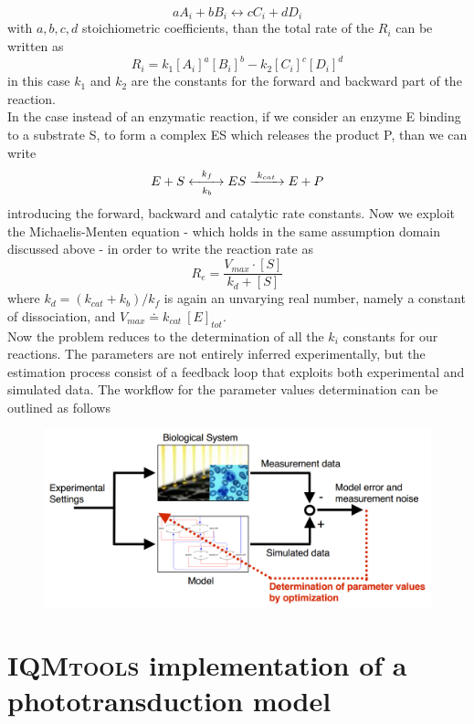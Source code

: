 \documentclass[pdf, color,12pt]{CITnote}
\begin{document}
$$ aA_i+bB_i\longleftrightarrow cC_i+dD_i
$$
with $a,b,c,d$ stoichiometric coefficients, than the total rate of the $R_i$ can be written as
$$ R_i = k_1[A_i]^a[B_i]^b-k_2[C_i]^c[D_i]^d
$$
in this case $k_1$ and $k_2$ are the constants for the forward and backward part of the reaction.
\\ In the case instead of an enzymatic reaction, if we consider an enzyme E binding to a substrate S, to form a complex ES which releases the product P, than we can write
$$E+S\xleftrightarrow[\ \ k_b \ \ ]{\ \ k_f \ \ } ES \xrightarrow{\ k_{cat} \ } E+P
$$
introducing the forward, backward and catalytic rate constants.
Now we exploit the Michaelis-Menten equation - which holds in the same assumption domain discussed above - in order to write the reaction rate as
$$R_e=\frac{V_{max}\cdot [S]}{k_d+[S]}
$$
where $k_d=(k_{cat}+k_b)/k_f$ is again an unvarying real number, namely a constant of dissociation, and $V_{max}\doteq k_{cat}\ [E]_{tot}$.
\\ Now the problem reduces to the determination of all the $k_i$ constants for our reactions.
The parameters are not entirely inferred experimentally, but the estimation process consist of a feedback loop that exploits both experimental and simulated data. The workflow for the parameter values determination can be outlined as follows
\begin{figure}[ht!]
\centering
\centerline{\includegraphics[scale=0.25]{WS1.png}}
\end{figure}


\section{{\large \textsc{IQMtools} implementation of a phototransduction model}}
\end{document}
